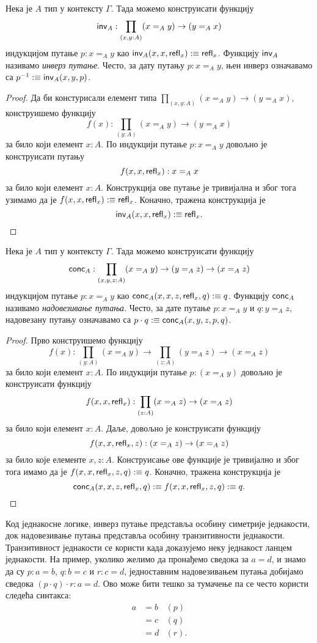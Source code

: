 \documentclass[12pt,oneside]{memoir}
\begin{document}
\begin{lemma}
    \label{lmm:inv}
    Нека је $A$ тип у контексту $\Gamma$. Тада можемо конструисати функцију \[\mathsf{inv}_{A} : \prod_{(x, y : A)} (x =_A y) \to (y =_A x)\] индукцијом путање $p : x =_A y$ као $\mathsf{inv}_{A} (x, x, \mathsf{refl}_{x}) :\equiv \mathsf{refl}_{x}$. Функцију $\mathsf{inv}_{A}$ називамо \emph{инверз путање}. Често, за дату путању $p : x =_A y$, њен инверз означавамо са $p^{-1} :\equiv \mathsf{inv}_{A}(x, y, p)$.
\end{lemma}
\begin{proof}
    Да би констурисали елемент типа $\prod_{(x,y : A)} (x =_A y) \to (y =_A x)$, конструишемо функцију \[ f(x) : \prod_{(y : A)} (x =_A y) \to (y =_A x)\] за било који елемент $x : A$. По индукцији путање $p : x =_A y$ довољно је конструисати путању \[ f(x, x, \mathsf{refl}_{x}) : x =_A x \] за било који елемент $x : A$. Конструкција ове путање је тривијална и због тога узимамо да је $f (x, x, \mathsf{refl}_{x}) :\equiv \mathsf{refl}_{x}$. Коначно, тражена конструкција је \[ \mathsf{inv}_{A} (x, x, \mathsf{refl}_{x}) :\equiv \mathsf{refl}_{x}. \] 
\end{proof}

\begin{lemma}
    \label{lmm:comp}
    Нека је $A$ тип у контексту $\Gamma$. Тада можемо конструисати функцију \[\mathsf{conc}_{A} : \prod_{(x, y, z : A)} (x =_A y) \to (y =_A z) \to (x =_A z)\] индукцијом путање $p : x =_A y$ као $\mathsf{conc}_{A} (x, x, z, \mathsf{refl}_{x}, q) :\equiv q$. Функцију $\mathsf{conc}_{A}$ називамо \emph{надовезивање путања}. Често, за дате путање $p : x =_A y$ и $q : y =_A z$, надовезану путању означавамо са $p \cdot q :\equiv \mathsf{conc}_{A} (x, y, z, p, q)$.
\end{lemma}
\begin{proof}
    Прво конструишемо функцију
    \[f(x) : \prod_{(y : A)} (x =_A y) \to \prod_{(z : A)} (y =_A z) \to (x =_A z)\] за било који елемент $x : A$. По индукцији путање $p : (x =_A y)$ довољно је конструисати функцију \[ f(x, x, \mathsf{refl}_{x}) : \prod_{(z : A)} (x =_A z) \to (x =_A z) \] за било који елемент $x : A$. Даље, довољно је конструисати функцију \[ f(x, x, \mathsf{refl}_{x}, z) : (x =_A z) \to (x =_A z) \] за било које елементе $x, z : A$. Конструисање ове функције је тривијално и због тога имамо да је $f(x, x, \mathsf{refl}_{x}, z, q) :\equiv q$. Коначно, тражена конструкција је \[\mathsf{conc}_{A}(x, x, z, \mathsf{refl}_{x}, q) :\equiv f(x, x, \mathsf{refl}_{x}, z, q) :\equiv q. \]
\end{proof}

Код једнакосне логике, инверз путање представља особину симетрије једнакости, док надовезивање путања представља особину транзитивности једнакости. Транзитивност једнакости се користи када доказујемо неку једнакост ланцем једнакости. На пример, уколико желимо да пронађемо сведока за $a = d$, и знамо да су $p : a = b$, $q : b = c$ и $r : c = d$, једноставним надовезивањем путања добијамо сведока $(p \cdot q) \cdot r : a = d$. Ово може бити тешко за тумачење па се често користи следећа синтакса:
\begin{align*}
    a &= b & (p) \\
      &= c & (q) \\
      &= d & (r).
\end{align*}
\end{document}
